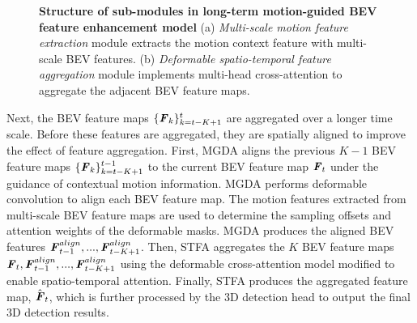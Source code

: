 \documentclass[letterpaper]{article} \usepackage{aaai23}  \usepackage{times}  \usepackage{helvet}  \usepackage{courier}  \usepackage[hyphens]{url}  \usepackage{graphicx} \urlstyle{rm} \def\UrlFont{\rm}  \usepackage{natbib}  \usepackage{caption} \frenchspacing  \setlength{\pdfpagewidth}{8.5in} \usepackage{algorithm}
\begin{document}
\begin{figure*}[t]
    
    \centering
    \begin{subfigure}[\textbf{Multi-scale motion feature extraction}]{\texttt{[image: figure/MGDA.pdf]}}
    \end{subfigure}
    \hspace{5mm}
    \begin{subfigure}[\textbf{Deformable spatio-temporal feature aggregation}]{\texttt{[image: figure/STFA.pdf]}}
    \end{subfigure}
    \caption {\textbf{Structure of sub-modules in  long-term motion-guided BEV feature enhancement model} (a) {\it Multi-scale motion feature extraction} module extracts the motion context feature with multi-scale BEV features. (b) {\it Deformable spatio-temporal feature aggregation} module implements multi-head cross-attention to aggregate the adjacent BEV feature maps. 
}
    \label{long_term_model}
\end{figure*}

Next, the BEV feature maps $\{\textbf{\textit{F}}_{k}\}_{k=t-K+1}^{t}$ are aggregated over a longer time scale. Before these features are aggregated, they are spatially aligned to improve the effect of feature aggregation.  First, MGDA aligns the previous $K-1$ BEV feature maps $\{\textbf{\textit{F}}_{k}\}_{k=t-K+1}^{t-1}$ to the current BEV feature map $\textbf{\textit{F}}_{t}$ under the guidance of contextual motion information. MGDA performs deformable convolution \cite{def-conv} to align each BEV feature map. The motion features extracted from multi-scale BEV feature maps are used to determine the sampling offsets and attention weights of the deformable masks. MGDA produces the aligned BEV features $\textbf{\textit{F}}_{t-1}^{align},...,\textbf{\textit{F}}_{t-K+1}^{align}$.
Then, STFA aggregates the $K$ BEV feature maps $\textbf{\textit{F}}_{t},\textbf{\textit{F}}_{t-1}^{align},...,\textbf{\textit{F}}_{t-K+1}^{align}$ using the deformable cross-attention model modified to enable spatio-temporal attention.
Finally, STFA produces the aggregated feature map, $\hat{\textbf{\textit{F}}}_t$, which is further processed by  the 3D detection head to output the final 3D detection results.
\end{document}
